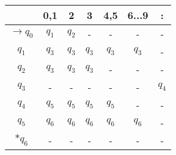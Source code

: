 \documentclass[12pt]{scrartcl}
\begin{document}
\begin{tabular}{c|cccccc}
& 0,1 & 2 & 3 & 4,5 & 6...9 & :\\\hline
$\rightarrow q_0$ & $q_1$ & $q_2$ & - & - & - & - \\
$q_1$ & $q_3$ & $q_3$ & $q_3$ & $q_3$& $q_3$ & - \\
$q_2$ & $q_3$ & $q_3$ & $q_3$ & - & - & - \\
$q_3$ & - & - & - & - & - & $q_4$ \\
$q_4$ & $q_5$ & $q_5$ & $q_5$ & $q_5$ & - & - \\
$q_5$ & $q_6$ & $q_6$ & $q_6$ & $q_6$ & $q_6$ & - \\
$*q_6$ & - & - & - & - & - & - \\
\end{tabular}
\end{document}
